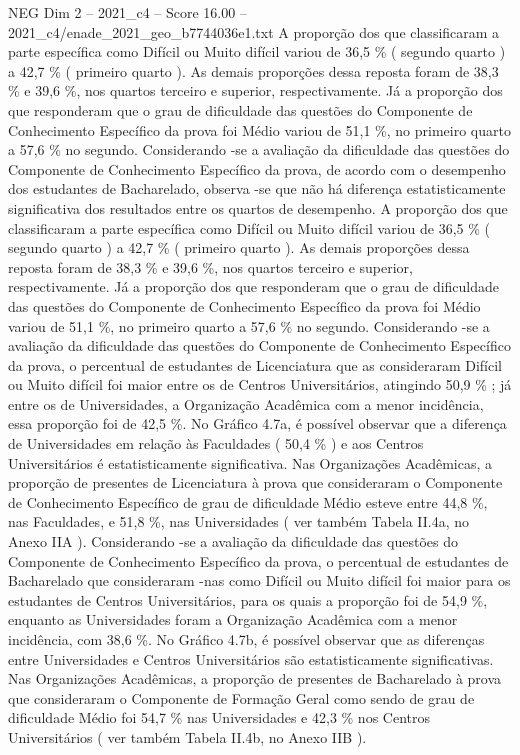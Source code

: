 \begin{textsample}{NEG Dim 2 – 2021\_c4 – Score 16.00 – 2021\_c4/enade\_2021\_geo\_b7744036e1.txt}
A proporção dos que classificaram a parte específica como Difícil ou Muito difícil variou de 36,5 \% ( segundo quarto ) a 42,7 \% ( primeiro quarto ).
As demais proporções dessa reposta foram de 38,3 \% e 39,6 \%, nos quartos terceiro e superior, respectivamente.
Já a proporção dos que responderam que o grau de dificuldade das questões do Componente de Conhecimento Específico da prova foi Médio variou de 51,1 \%, no primeiro quarto a 57,6 \% no segundo.
Considerando -se a avaliação da dificuldade das questões do Componente de Conhecimento Específico da prova, de acordo com o desempenho dos estudantes de Bacharelado, observa -se que não há diferença estatisticamente significativa dos resultados entre os quartos de desempenho.
A proporção dos que classificaram a parte específica como Difícil ou Muito difícil variou de 36,5 \% ( segundo quarto ) a 42,7 \% ( primeiro quarto ).
As demais proporções dessa reposta foram de 38,3 \% e 39,6 \%, nos quartos terceiro e superior, respectivamente.
Já a proporção dos que responderam que o grau de dificuldade das questões do Componente de Conhecimento Específico da prova foi Médio variou de 51,1 \%, no primeiro quarto a 57,6 \% no segundo.
Considerando -se a avaliação da dificuldade das questões do Componente de Conhecimento Específico da prova, o percentual de estudantes de Licenciatura que as consideraram Difícil ou Muito difícil foi maior entre os de Centros Universitários, atingindo 50,9 \% ; já entre os de Universidades, a Organização Acadêmica com a menor incidência, essa proporção foi de 42,5 \%.
No Gráfico 4.7a, é possível observar que a diferença de Universidades em relação às Faculdades ( 50,4 \% ) e aos Centros Universitários é estatisticamente significativa.
Nas Organizações Acadêmicas, a proporção de presentes de Licenciatura à prova que consideraram o Componente de Conhecimento Específico de grau de dificuldade Médio esteve entre 44,8 \%, nas Faculdades, e 51,8 \%, nas Universidades ( ver também Tabela II.4a, no Anexo IIA ).
Considerando -se a avaliação da dificuldade das questões do Componente de Conhecimento Específico da prova, o percentual de estudantes de Bacharelado que consideraram -nas como Difícil ou Muito difícil foi maior para os estudantes de Centros Universitários, para os quais a proporção foi de 54,9 \%, enquanto as Universidades foram a Organização Acadêmica com a menor incidência, com 38,6 \%.
No Gráfico 4.7b, é possível observar que as diferenças entre Universidades e Centros Universitários são estatisticamente significativas.
Nas Organizações Acadêmicas, a proporção de presentes de Bacharelado à prova que consideraram o Componente de Formação Geral como sendo de grau de dificuldade Médio foi 54,7 \% nas Universidades e 42,3 \% nos Centros Universitários ( ver também Tabela II.4b, no Anexo IIB ).

\end{textsample}
